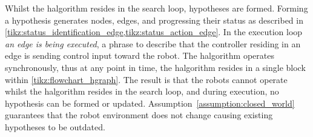 Whilst the \ac{halgorithm} resides in the search loop, hypotheses are formed. Forming a hypothesis generates nodes, edges, and progressing their status as described in \cref{tikz:status_identification_edge,tikz:status_action_edge}. In the execution loop \textit{an edge is being executed}, a phrase to describe that the controller residing in an edge is sending control input toward the robot. The \ac{halgorithm} operates synchronously, thus at any point in time, the \ac{halgorithm} resides in a single block within \cref{tikz:flowchart_hgraph}. The result is that the robots cannot operate whilst the \ac{halgorithm} resides in the search loop, and during execution, no hypothesis can be formed or updated. Assumption~\ref{assumption:closed_world} guarantees that the robot environment does not change causing existing hypotheses to be outdated.\bs

